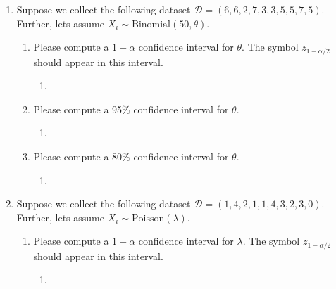 \documentclass[krantz1,ChapterTOCs]{krantz}
\begin{document}
\begin{enumerate}
\begin{enumerate}
\begin{enumerate}
{            } 
        \end{enumerate}

        \end{enumerate}
        
    \item Suppose we collect the following dataset $\mathcal{D} = (6, 6, 2, 7, 3, 3, 5, 5, 7, 5)$. Further, lets assume $X_{i} \sim \text{Binomial}(50,\theta)$.
        \begin{enumerate}
            \item Please compute a $1-\alpha$ confidence interval for $\theta$. The symbol $z_{1-\alpha/2}$ should appear in this interval. 
            \begin{enumerate}
            \item {
            \color{red} 
        
            } 
        \end{enumerate}

            \item Please compute a 95\% confidence interval for $\theta$.
            \begin{enumerate}
            \item {
            \color{red} 
        
            } 
        \end{enumerate}

            \item Please compute a 80\% confidence interval for $\theta$.
            \begin{enumerate}
            \item {
            \color{red} 
        
            } 
        \end{enumerate}

        \end{enumerate}
        

    \item Suppose we collect the following dataset $\mathcal{D} = (1, 4, 2, 1, 1, 4, 3, 2, 3, 0)$. Further, lets assume $X_{i} \sim \text{Poisson}(\lambda)$.
        \begin{enumerate}
            \item Please compute a $1-\alpha$ confidence interval for $\lambda$. The symbol $z_{1-\alpha/2}$ should appear in this interval. 
            \begin{enumerate}
            \item {
            \color{red} 
        
}
\end{enumerate}
\end{enumerate}
\end{enumerate}
\end{document}

